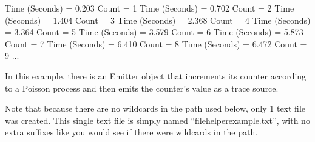 \documentclass[letterpaper,10pt,english]{sphinxmanual}
\begin{document}
\begin{sphinxVerbatim}[commandchars=\\\{\}]
Time (Seconds) = 0.203  Count = 1
Time (Seconds) = 0.702  Count = 2
Time (Seconds) = 1.404  Count = 3
Time (Seconds) = 2.368  Count = 4
Time (Seconds) = 3.364  Count = 5
Time (Seconds) = 3.579  Count = 6
Time (Seconds) = 5.873  Count = 7
Time (Seconds) = 6.410  Count = 8
Time (Seconds) = 6.472  Count = 9
...
\end{sphinxVerbatim}

In this example, there is an Emitter object that increments
its counter according to a Poisson process and then emits the counter’s
value as a trace source.

\begin{sphinxVerbatim}[commandchars=\\\{\}]
    
  
\end{sphinxVerbatim}

Note that because there are no wildcards in the path
used below, only 1 text file was created.
This single text file is simply named
“file\sphinxhyphen{}helper\sphinxhyphen{}example.txt”, with no extra suffixes like
you would see if there were wildcards in the path.

\begin{sphinxVerbatim}[commandchars=\\\{\}]
 

 

 

 
\end{sphinxVerbatim}
\end{document}

